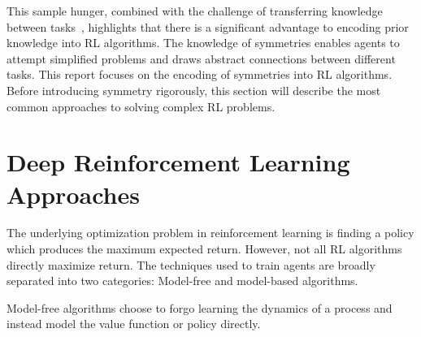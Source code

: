 This sample hunger, combined with the challenge of transferring knowledge between tasks~\cite{kirkpatrick2017overcoming}, highlights that there is a significant advantage to encoding prior knowledge into RL algorithms. The knowledge of symmetries enables agents to attempt simplified problems and draws abstract connections between different tasks. This report focuses on the encoding of symmetries into RL algorithms. Before introducing symmetry rigorously, this section will describe the most common approaches to solving complex RL problems.

\section{Deep Reinforcement Learning Approaches}
The underlying optimization problem in reinforcement learning is finding a policy which produces the maximum expected return. However, not all RL algorithms directly maximize return. The techniques used to train agents are broadly separated into two categories: Model-free and model-based algorithms.

Model-free algorithms choose to forgo learning the dynamics of a process and instead model the value function or policy directly.

